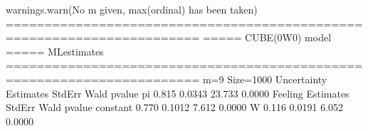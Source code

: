 \documentclass[letterpaper,10pt,english]{sphinxmanual}
\begin{document}
\begin{sphinxVerbatim}[commandchars=\\\{\}]
warnings.warn(\PYGZdq{}No m given, max(ordinal) has been taken\PYGZdq{})
=======================================================================
=====\PYGZgt{}\PYGZgt{}\PYGZgt{} CUBE(0W0) model \PYGZlt{}\PYGZlt{}\PYGZlt{}===== ML\PYGZhy{}estimates
=======================================================================
m=9  Size=1000
\PYGZhy{}\PYGZhy{}\PYGZhy{}\PYGZhy{}\PYGZhy{}\PYGZhy{}\PYGZhy{}\PYGZhy{}\PYGZhy{}\PYGZhy{}\PYGZhy{}\PYGZhy{}\PYGZhy{}\PYGZhy{}\PYGZhy{}\PYGZhy{}\PYGZhy{}\PYGZhy{}\PYGZhy{}\PYGZhy{}\PYGZhy{}\PYGZhy{}\PYGZhy{}\PYGZhy{}\PYGZhy{}\PYGZhy{}\PYGZhy{}\PYGZhy{}\PYGZhy{}\PYGZhy{}\PYGZhy{}\PYGZhy{}\PYGZhy{}\PYGZhy{}\PYGZhy{}\PYGZhy{}\PYGZhy{}\PYGZhy{}\PYGZhy{}\PYGZhy{}\PYGZhy{}\PYGZhy{}\PYGZhy{}\PYGZhy{}\PYGZhy{}\PYGZhy{}\PYGZhy{}\PYGZhy{}\PYGZhy{}\PYGZhy{}\PYGZhy{}\PYGZhy{}\PYGZhy{}\PYGZhy{}\PYGZhy{}\PYGZhy{}\PYGZhy{}\PYGZhy{}\PYGZhy{}\PYGZhy{}\PYGZhy{}\PYGZhy{}\PYGZhy{}\PYGZhy{}\PYGZhy{}\PYGZhy{}\PYGZhy{}\PYGZhy{}\PYGZhy{}\PYGZhy{}\PYGZhy{}
Uncertainty
          Estimates  StdErr    Wald  p\PYGZhy{}value
pi            0.815  0.0343  23.733   0.0000
\PYGZhy{}\PYGZhy{}\PYGZhy{}\PYGZhy{}\PYGZhy{}\PYGZhy{}\PYGZhy{}\PYGZhy{}\PYGZhy{}\PYGZhy{}\PYGZhy{}\PYGZhy{}\PYGZhy{}\PYGZhy{}\PYGZhy{}\PYGZhy{}\PYGZhy{}\PYGZhy{}\PYGZhy{}\PYGZhy{}\PYGZhy{}\PYGZhy{}\PYGZhy{}\PYGZhy{}\PYGZhy{}\PYGZhy{}\PYGZhy{}\PYGZhy{}\PYGZhy{}\PYGZhy{}\PYGZhy{}\PYGZhy{}\PYGZhy{}\PYGZhy{}\PYGZhy{}\PYGZhy{}\PYGZhy{}\PYGZhy{}\PYGZhy{}\PYGZhy{}\PYGZhy{}\PYGZhy{}\PYGZhy{}\PYGZhy{}\PYGZhy{}\PYGZhy{}\PYGZhy{}\PYGZhy{}\PYGZhy{}\PYGZhy{}\PYGZhy{}\PYGZhy{}\PYGZhy{}\PYGZhy{}\PYGZhy{}\PYGZhy{}\PYGZhy{}\PYGZhy{}\PYGZhy{}\PYGZhy{}\PYGZhy{}\PYGZhy{}\PYGZhy{}\PYGZhy{}\PYGZhy{}\PYGZhy{}\PYGZhy{}\PYGZhy{}\PYGZhy{}\PYGZhy{}\PYGZhy{}
Feeling
          Estimates  StdErr    Wald  p\PYGZhy{}value
constant     \PYGZhy{}0.770  0.1012  \PYGZhy{}7.612   0.0000
W            \PYGZhy{}0.116  0.0191  \PYGZhy{}6.052   0.0000
\PYGZhy{}\PYGZhy{}\PYGZhy{}\PYGZhy{}\PYGZhy{}\PYGZhy{}\PYGZhy{}\PYGZhy{}\PYGZhy{}\PYGZhy{}\PYGZhy{}\PYGZhy{}\PYGZhy{}\PYGZhy{}\PYGZhy{}\PYGZhy{}\PYGZhy{}\PYGZhy{}\PYGZhy{}\PYGZhy{}\PYGZhy{}\PYGZhy{}\PYGZhy{}\PYGZhy{}\PYGZhy{}\PYGZhy{}\PYGZhy{}\PYGZhy{}\PYGZhy{}\PYGZhy{}\PYGZhy{}\PYGZhy{}\PYGZhy{}\PYGZhy{}\PYGZhy{}\PYGZhy{}\PYGZhy{}\PYGZhy{}\PYGZhy{}\PYGZhy{}\PYGZhy{}\PYGZhy{}\PYGZhy{}\PYGZhy{}\PYGZhy{}\PYGZhy{}\PYGZhy{}\PYGZhy{}\PYGZhy{}\PYGZhy{}\PYGZhy{}\PYGZhy{}\PYGZhy{}\PYGZhy{}\PYGZhy{}\PYGZhy{}\PYGZhy{}\PYGZhy{}\PYGZhy{}\PYGZhy{}\PYGZhy{}\PYGZhy{}\PYGZhy{}\PYGZhy{}\PYGZhy{}\PYGZhy{}\PYGZhy{}\PYGZhy{}\PYGZhy{}\PYGZhy{}\PYGZhy{}

\end{sphinxVerbatim}
\end{document}
